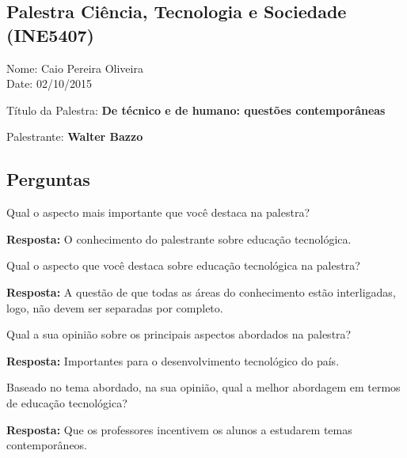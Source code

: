 \documentclass{article}
\begin{document}
\begin{center}
\section*{Palestra Ciência, Tecnologia e Sociedade (INE5407)}
\begin{center}
Nome: Caio Pereira Oliveira
\\Date: 02/10/2015
\end{center}
Título da Palestra: {\bf De técnico e de humano: questões contemporâneas}

Palestrante: {\bf Walter Bazzo}

\subsection*{Perguntas}

\end{center}

\begin{enumerate}

{\bf \item Qual o aspecto mais importante que você destaca na palestra?}

{\bf Resposta:} O conhecimento do palestrante sobre educação tecnológica.

{\bf \item Qual o aspecto que você destaca sobre educação tecnológica na palestra?}

{\bf Resposta:} A questão de que todas as áreas do conhecimento estão interligadas, logo, não devem ser separadas por completo.

{\bf \item Qual a sua opinião sobre os principais aspectos abordados na palestra?}

{\bf Resposta:} Importantes para o desenvolvimento tecnológico do país.

{\bf \item Baseado no tema abordado, na sua opinião, qual a melhor abordagem em termos de educação tecnológica?}

{\bf Resposta:} Que os professores incentivem os alunos a estudarem temas contemporâneos.

\end{enumerate}
\end{document}
